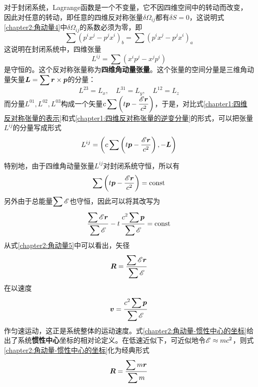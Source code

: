 对于封闭系统，Lagrange函数是一个不变量，它不因四维空间中的转动而改变，因此对任意的转动，即任意的四维反对称张量$\delta\varOmega_{ij}$都有$\delta S=0$，这说明式\eqref{chapter2:角动量4}中$\delta\varOmega_{ij}$的系数必须为零，即
\begin{equation}
	\sum (p^ix^j-p^jx^i)_b = \sum (p^ix^j-p^jx^i)_a
\end{equation}
这说明在封闭系统中，四维张量
\begin{equation}
	L^{ij} = \sum (x^ip^j-x^jp^i)
	\label{chapter2:四维角动量张量的定义}
\end{equation}
是守恒的。这个反对称张量称为{\bf 四维角动量张量}。这个张量的空间分量是三维角动量矢量$\displaystyle \boldsymbol{L} = \sum\boldsymbol{r}\times \boldsymbol{p}$的分量：
\begin{equation*}
	L^{23} = L_x,\quad L^{31} = L_y,\quad L^{12} = L_z
\end{equation*}
而分量$L^{01}, L^{02}, L^{03}$构成一个矢量$\displaystyle c\sum \left(t\boldsymbol{p}-\dfrac{\mathscr{E}\boldsymbol{r}}{c^2}\right)$，于是，对比式\eqref{chapter1:四维反对称张量的表示}和式\eqref{chapter1:四维反对称张量的逆变分量}的形式，可以把张量$L^{ij}$的分量写成形式
\begin{equation}
	L^{ij} = \left(c\sum \left(t\boldsymbol{p}-\dfrac{\mathscr{E}\boldsymbol{r}}{c^2}\right), -\boldsymbol{L}\right)
	\label{chapter2:四维角动量张量的逆变分量表示}
\end{equation}

特别地，由于四维角动量张量$L^{ij}$对封闭系统守恒，所以有
\begin{equation*}
	\sum \left(t\boldsymbol{p}-\frac{\mathscr{E}\boldsymbol{r}}{c^2}\right) = \text{const}
\end{equation*}
另外由于总能量$\displaystyle\sum \mathscr{E}$也守恒，因此可以将其改写为
\begin{equation}
	\frac{\displaystyle \sum\mathscr{E}\boldsymbol{r}}{\displaystyle \sum \mathscr{E}} - t\,\frac{\displaystyle c^2\sum\boldsymbol{p}}{\displaystyle \sum\mathscr{E}} = \text{const}
	\label{chapter2:角动量5}
\end{equation}
从式\eqref{chapter2:角动量5}中可以看出，矢径
\begin{equation}
	\boldsymbol{R} = \frac{\displaystyle\sum \mathscr{E}\boldsymbol{r}}{\displaystyle\sum\mathscr{E}}
	\label{chapter2:角动量-惯性中心的坐标}
\end{equation}
在以速度
\begin{equation}
	\boldsymbol{v} = \frac{\displaystyle c^2\sum\boldsymbol{p}}{\displaystyle\sum\mathscr{E}}
	\label{chapter2:角动量-惯性中心的速度}
\end{equation}
作匀速运动，这正是系统整体的运动速度。式\eqref{chapter2:角动量-惯性中心的坐标}给出了系统{\bf 惯性中心}坐标的相对论定义。在低速近似下，可近似地令$\mathscr{E}\approx mc^2$，则式\eqref{chapter2:角动量-惯性中心的坐标}化为经典形式
\begin{equation*}
	\boldsymbol{R} = \frac{\displaystyle \sum m\boldsymbol{r}}{\displaystyle \sum m}
\end{equation*}

